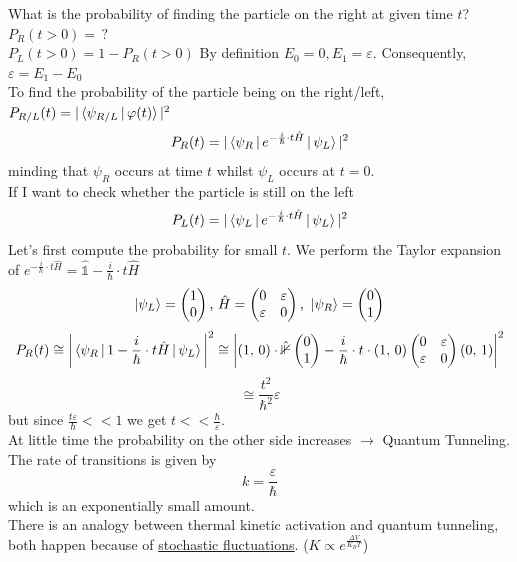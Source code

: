 What is the probability of finding the particle on the right at given time $t$?\\
$P_R(t>0)=\,?$\\
$P_L(t>0)=1-P_R(t>0)$
By definition $E_0=0, E_1= \varepsilon$. Consequently, $\varepsilon = E_1-E_0$\\
To find the probability of the particle being on the right/left, $P_{R/L}(t)=|\braket{\psi_{R/L}\,|\,\varphi(t)}|^2$\\
\[
P_R(t)=|\braket{\psi_R\,|\,e^{-\frac{i}{\hbar}\cdot t \hat{H}}\,|\,\psi_L}|^2
\]
minding that $\psi_R$ occurs at time $t$ whilst $\psi_L$ occurs at $t=0$.\\
If I want to check whether the particle is still on the left
\[
P_L(t)=|\braket{\psi_L\,|\,e^{-\frac{i}{\hbar}\cdot t \hat{H}}\,|\,\psi_L}|^2
\]
Let's first compute the probability for small $t$. We perform the Taylor expansion of $e^{-\frac{i}{\hbar}\cdot t \hat{H}} = \mathbb{\hat{1}}-\frac{i}{\hbar}\cdot t\hat{H}$
\[
\ket{\psi_L}=\begin{pmatrix}
1\\0
\end{pmatrix}
\text{, }
\hat{H}=
\begin{pmatrix}
0 & \varepsilon\\ \varepsilon & 0
\end{pmatrix}
\text{, }
\ket{\psi_R}=
\begin{pmatrix}
0\\1
\end{pmatrix}
\]
\[
P_R(t)\cong\bigg|\braket{\psi_R\,|\,1-\frac{i}{\hbar}\cdot t \hat{H}\,|\,\psi_L}\bigg|^2 \cong
\bigg|(1,\,0) \cdot \mathbb{\hat{1}}
\begin{pmatrix}
0\\1
\end{pmatrix}
-\frac{i}{\hbar}\cdot t \cdot (1,\,0)
\begin{pmatrix}
0 & \varepsilon\\ \varepsilon & 0
\end{pmatrix}
(0,\,1)\bigg|^2
\]
\[
\cong \frac{t^2}{\hbar^2}\varepsilon
\]
but since $\frac{t\varepsilon}{\hbar}<<1$ we get $t << \frac{\hbar}{\varepsilon}$.\\
At little time the probability on the other side increases $\rightarrow$ Quantum Tunneling. \\
The rate of transitions is given by
\[
k=\frac{\varepsilon}{\hbar}
\]
which is an exponentially small amount.\\
There is an analogy between thermal kinetic activation and quantum tunneling, both happen because of \underline{stochastic fluctuations}. ($K\propto e^{\frac{\Delta V}{K_B T}}$)\\
